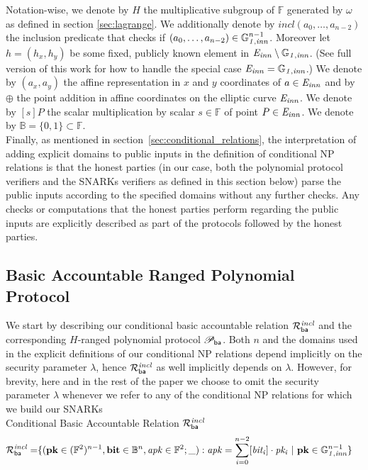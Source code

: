 \noindent Notation-wise, we denote by $H$ the multiplicative subgroup of $\mathbb{F}$ generated 
by $\omega$ as defined in section \ref{sec:lagrange}. We additionally denote by $\mathit{incl}(a_0, \ldots, a_{n-2})$ the inclusion 
predicate that checks if $(a_0, \ldots, a_{n-2}) \in \mathbb{G}_{\mathit{1,inn}}^{n-1}$. Moreover let $h = (\mathit{h_x}, \mathit{h_y})$ 
be some fixed, publicly known element in $\mathit{E}_{\mathit{inn}} \setminus \mathbb{G}_{\mathit{1,inn}}$. (See full version of this work for how to handle the special case $\mathit{E}_{\mathit{inn}} = \mathbb{G}_{\mathit{1,inn}}$.)
We denote by $(a_x, a_y)$ the affine representation in $x$ and $y$ coordinates of $a \in \mathit{E}_{\mathit{inn}}$ and by $\oplus$ the point addition 
in affine coordinates on the elliptic curve $\mathit{E}_{\mathit{inn}}$. We denote by $[s]P$ the scalar multiplication by scalar $s \in \mathbb{F}$ of point 
$P \in \mathit{E}_{\mathit{inn}}$. We denote by $\mathbb{B} = \{0,1\} \subset \mathbb{F}$. \\

\noindent Finally, as mentioned in section~\ref{sec:conditional_relations}, the interpretation of adding explicit domains to public 
inputs in the definition of conditional NP relations is that the honest parties (in our case, both the polynomial protocol verifiers and the SNARKs verifiers 
as defined in this section below) parse the public inputs according to the specified domains without any further checks. Any checks or 
computations that the honest parties perform regarding the public inputs are explicitly described as part of the protocols followed by 
the honest parties.

\subsection{Basic Accountable Ranged Polynomial Protocol}
\label{sec_la}

\noindent We start by describing our conditional basic accountable relation $\mathcal{R}^{\mathit{incl}}_{\mathsf{ba}}$ and the 
corresponding $H$-ranged polynomial protocol $\mathscr{P}_{\mathsf{ba}}$. Both $n$ and the domains used in the explicit definitions 
of our conditional NP relations depend implicitly on the security parameter $\lambda$, hence $\mathcal{R}^{\mathit{incl}}_{\mathsf{ba}}$ as well implicitly depends on $\lambda$. 
However, for brevity, here and in the rest of the paper we choose to omit the security parameter $\lambda$ whenever we refer to any of the conditional 
NP relations for which we build our SNARKs \\
 
\noindent \textsf{Conditional Basic Accountable Relation $\mathcal{R}^{\mathit{incl}}_{\mathsf{ba}}$}  
\begin{equation*}
\begin{split}
\mathcal{R}^{\mathit{incl}}_{\mathsf{ba}} = & \{(\mathbf{pk} \in ({\mathbb{F}^2})^{n-1}, \mathbf{bit} \in \mathbb{B}^n,
\mathit{apk} \in \mathbb{F}^2; \_) : \mathit{apk} = \sum_{i=0}^{n-2} [\mathit{bit_i}] \cdot \mathit{pk_i} \ | \ \mathbf{pk} \in \mathbb{G}_{\mathit{1,inn}}^{n-1} \} 
\end{split}
\end{equation*}

